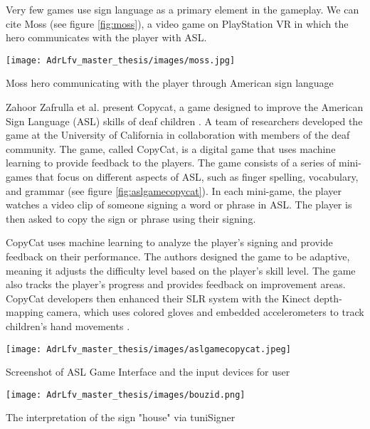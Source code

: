 Very few games use sign language as a primary element in the gameplay. We can cite Moss \cite{moss2018} (see figure \ref{fig:moss}), a video game on PlayStation VR in which the hero communicates with the player with ASL. 

\begin{marginfigure}
    \centering
    \texttt{[image: AdrLfv\_master\_thesis/images/moss.jpg]}
    \caption{Moss hero communicating with the player through American sign language}
    \label{fig:moss}
\end{marginfigure}

Zahoor Zafrulla et al. present Copycat, a game designed to improve the American Sign Language (ASL) skills of deaf children \cite{zafrulla2011copycat}. A team of researchers developed the game at the University of California in collaboration with members of the deaf community.
The game, called CopyCat, is a digital game that uses machine learning to provide feedback to the players. The game consists of a series of mini-games that focus on different aspects of ASL, such as finger spelling, vocabulary, and grammar (see figure \ref{fig:aslgamecopycat}). In each mini-game, the player watches a video clip of someone signing a word or phrase in ASL. The player is then asked to copy the sign or phrase using their signing.

CopyCat uses machine learning to analyze the player's signing and provide feedback on their performance. The authors designed the game to be adaptive, meaning it adjusts the difficulty level based on the player's skill level. The game also tracks the player's progress and provides feedback on improvement areas.
CopyCat developers then enhanced their SLR system with the Kinect depth-mapping camera, which uses colored gloves and embedded accelerometers to track children's hand movements \cite{zafrulla2011american}.

\begin{marginfigure}
    \centering
    \texttt{[image: AdrLfv\_master\_thesis/images/aslgamecopycat.jpeg]}
    \caption{Screenshot of ASL Game Interface and the input devices for user  }
    \label{fig:aslgamecopycat}
\end{marginfigure}

\begin{marginfigure}
    \centering
    \texttt{[image: AdrLfv\_master\_thesis/images/bouzid.png]}
    \caption{The interpretation of the sign "house" via tuniSigner}
    \label{fig:bouzid}
\end{marginfigure}

